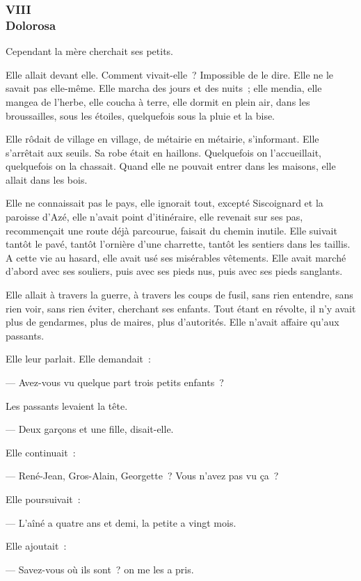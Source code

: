 \documentclass[french,twoside]{book} %
\begin{document}
 \subsubsection[{VIII. Dolorosa}]{VIII \\
Dolorosa}
\label{p3l2c8}
\noindent Cependant la mère cherchait ses petits.\par
Elle allait devant elle. Comment vivait-elle ? Impossible de le dire. Elle ne le savait pas elle-même. Elle marcha des jours et des nuits ; elle mendia, elle mangea de l’herbe, elle coucha à terre, elle dormit en plein air, dans les broussailles, sous les étoiles, quelquefois sous la pluie et la bise.\par
Elle rôdait de village en village, de métairie en métairie, s’informant. Elle s’arrêtait aux seuils. Sa robe était en haillons. Quelquefois on l’accueillait, quelquefois on la chassait. Quand elle ne pouvait entrer dans les maisons, elle allait dans les bois.\par
Elle ne connaissait pas le pays, elle ignorait tout, excepté Siscoignard et la paroisse d’Azé, elle n’avait point d’itinéraire, elle revenait sur ses pas, recommençait une route déjà parcourue, faisait du chemin inutile. Elle suivait tantôt le pavé, tantôt l’ornière d’une charrette, tantôt les sentiers dans les taillis. A cette vie au hasard, elle avait usé ses misérables vêtements. Elle avait marché d’abord avec ses souliers, puis avec ses pieds nus, puis avec ses pieds sanglants.\par
Elle allait à travers la guerre, à travers les coups de fusil, sans rien entendre, sans rien voir, sans rien  éviter, cherchant ses enfants. Tout étant en révolte, il n’y avait plus de gendarmes, plus de maires, plus d’autorités. Elle n’avait affaire qu’aux passants.\par
Elle leur parlait. Elle demandait :\par
— Avez-vous vu quelque part trois petits enfants ? \par
Les passants levaient la tête.\par
— Deux garçons et une fille, disait-elle.\par
Elle continuait :\par
— René-Jean, Gros-Alain, Georgette ? Vous n’avez pas vu ça ?\par
Elle poursuivait :\par
— L’aîné a quatre ans et demi, la petite a vingt mois.\par
Elle ajoutait :\par
— Savez-vous où ils sont ? on me les a pris.\par
\end{document}
